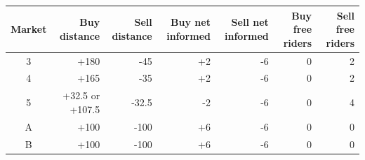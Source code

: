 \begin{tabular}{crrrrrr}
\toprule
Market & Buy distance & Sell distance & Buy net informed & Sell net informed & Buy free riders & Sell free riders \\
\midrule
3 & +180 & -45 & +2 & -6 & 0 & 2 \\
4 & +165 & -35 & +2 & -6 & 0 & 2 \\
5 & +32.5 or +107.5 & -32.5 & -2 & -6 & 0 & 4 \\
A & +100 & -100 & +6 & -6 & 0 & 0 \\
B & +100 & -100 & +6 & -6 & 0 & 0 \\
\bottomrule
\end{tabular}
